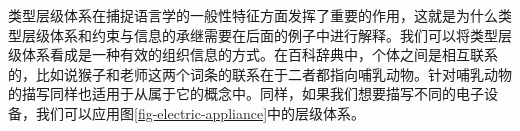 类型层级体系\label{Seite-Typhierarchie}在捕捉语言学的一般性特征方面发挥了重要的作用，这就是为什么类型层级体系和约束与信息的承继需要在后面的例子中进行解释。我们可以将类型层级体系看成是一种有效的组织信息的方式。在百科辞典中，个体之间是相互联系的，比如说猴子和老师这两个词条的联系在于二者都指向哺乳动物。针对哺乳动物的描写同样也适用于从属于它的概念中。同样，如果我们想要描写不同的电子设备，我们可以应用图\vref{fig-electric-appliance}中的层级体系。
